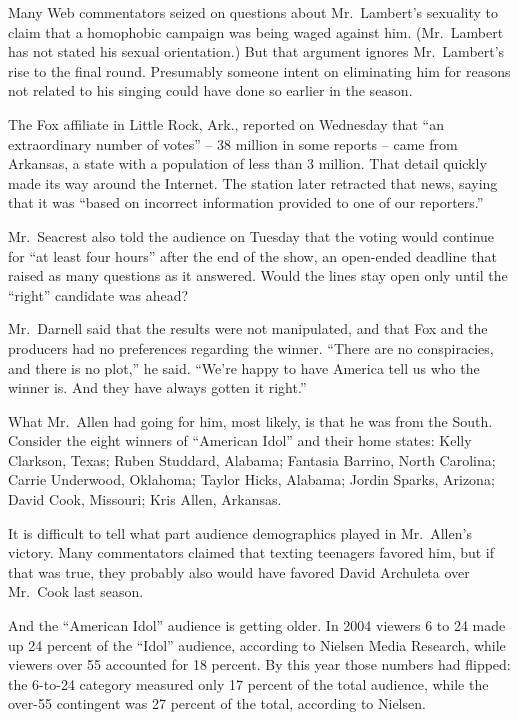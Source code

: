 \documentclass[12pt,a4paper,onecolumn]{article}
\begin{document}
Many Web commentators seized on questions about Mr.~Lambert's sexuality to claim that a homophobic
campaign was being waged against him. (Mr.~Lambert has not stated his sexual orientation.) But that
argument ignores Mr.~Lambert's rise to the final round. Presumably someone intent on eliminating him
for reasons not related to his singing could have done so earlier in the season.

The Fox affiliate in Little Rock, Ark., reported on Wednesday that ``an extraordinary number of
votes'' -- 38 million in some reports -- came from Arkansas, a state with a population of less than
3 million. That detail quickly made its way around the Internet. The station later retracted that
news, saying that it was ``based on incorrect information provided to one of our reporters.''

Mr.~Seacrest also told the audience on Tuesday that the voting would continue for ``at least four
hours'' after the end of the show, an open-ended deadline that raised as many questions as it
answered. Would the lines stay open only until the ``right'' candidate was ahead?

Mr.~Darnell said that the results were not manipulated, and that Fox and the producers had no
preferences regarding the winner. ``There are no conspiracies, and there is no plot,'' he said.
``We're happy to have America tell us who the winner is. And they have always gotten it right.''

What Mr.~Allen had going for him, most likely, is that he was from the South. Consider the eight
winners of ``American Idol'' and their home states: Kelly Clarkson, Texas; Ruben Studdard, Alabama;
Fantasia Barrino, North Carolina; Carrie Underwood, Oklahoma; Taylor Hicks, Alabama; Jordin Sparks,
Arizona; David Cook, Missouri; Kris Allen, Arkansas.

It is difficult to tell what part audience demographics played in Mr.~Allen's victory. Many
commentators claimed that texting teenagers favored him, but if that was true, they probably also
would have favored David Archuleta over Mr.~Cook last season.

And the ``American Idol'' audience is getting older. In 2004 viewers 6 to 24 made up 24 percent of
the ``Idol'' audience, according to Nielsen Media Research, while viewers over 55 accounted for 18
percent. By this year those numbers had flipped: the 6-to-24 category measured only 17 percent of
the total audience, while the over-55 contingent was 27 percent of the total, according to Nielsen.
\end{document}
